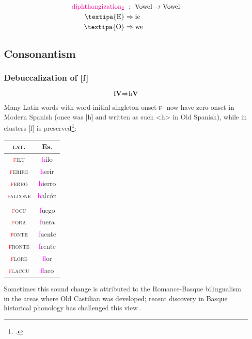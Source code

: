 \documentclass{report}[12pt]
\begin{document}
\begin{tcolorbox}
  \begin{align*}
    \text{\textcolor{magenta}{diphthongization$_2$}} &\ :\ \text{Vowel} \rightarrow \text{Vowel} \\
    \text{\textipa{E}} & \Rightarrow \text{ie} \\
    \text{\textipa{O}} & \Rightarrow \text{we} \\
  \end{align*}
\end{tcolorbox}

\subsection{Consonantism}

\subsubsection{Debuccalization of [f]}

\begin{tcolorbox}
  \[ \text{f}\textbf{V} \Rightarrow \text{h}\textbf{V} \]
\end{tcolorbox}

Many Latin words with word-initial singleton onset \textsc{f}- now have zero onset in Modern Spanish (once was [h] and written as such <h> in Old Spanish), while in clusters [f] is preserved\footcite[p.~50]{romance_his}:
\begin{center}
  \begin{tabular}{c c}
    \textsc{lat.} & Es. \\
    \hline
    \textsc{\textcolor{red}{f}ilu} & \textcolor{magenta}{h}ilo \\
    \textsc{\textcolor{red}{f}erire} & \textcolor{magenta}{h}erir \\
    \textsc{\textcolor{red}{f}erro} & \textcolor{magenta}{h}ierro \\
    \textsc{\textcolor{red}{f}alcone} & \textcolor{magenta}{h}alcón \\
                  & \\
    \textsc{\textcolor{red}{f}ocu} & \textcolor{magenta}{f}uego \\
    \textsc{\textcolor{red}{f}ora} & \textcolor{magenta}{f}uera \\
    \textsc{\textcolor{red}{f}onte} & \textcolor{magenta}{f}uente \\
    \textsc{\textcolor{red}{f}ronte} & \textcolor{magenta}{f}rente \\
    \textsc{\textcolor{red}{f}lore} & \textcolor{magenta}{f}lor \\
    \textsc{\textcolor{red}{f}laccu} & \textcolor{magenta}{f}laco \\
  \end{tabular}
\end{center}
Sometimes this sound change is attributed to the Romance-Basque bilingualism in the areas where Old Castilian was developed; recent discovery in Basque historical phonology has challenged this view \parencite{manterola_hualde}.
\end{document}

